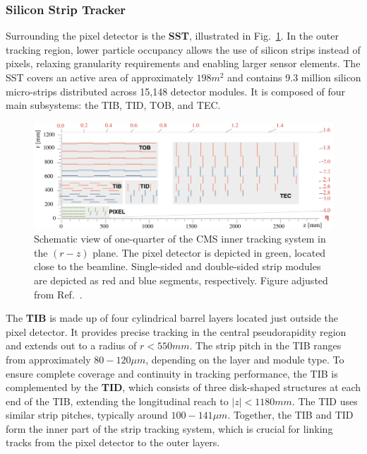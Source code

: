 \subsubsection{Silicon Strip Tracker}
Surrounding the pixel detector is the \textbf{\ac{SST}}, illustrated in Fig.~\ref{Figure:Chapter3_Tracker_Geometry}. In the outer tracking region, lower particle occupancy allows the use of silicon strips instead of pixels, relaxing granularity requirements and enabling larger sensor elements. The SST covers an active area of approximately $198\unit{m}^2$ and contains 9.3 million silicon micro-strips distributed across 15,148 detector modules. It is composed of four main subsystems: the \ac{TIB}, \ac{TID}, \ac{TOB}, and \ac{TEC}.

\begin{figure}[h]
\centering
\includegraphics[width=1\textwidth]{Figures/Chapter3/Phase1_Tracker.pdf}
\caption[Schematic of CMS inner tracking system in the $(r-z)$ plane]{Schematic view of one-quarter of the CMS inner tracking system in the $(r-z)$ plane. The pixel detector is depicted in green, located close to the beamline. Single-sided and double-sided strip modules are depicted as red and blue segments, respectively. Figure adjusted from Ref.~\cite{CMS_Detector_Run3}.}
\label{Figure:Chapter3_Tracker_Geometry}
\end{figure}

The \textbf{TIB} is made up of four cylindrical barrel layers located just outside the pixel detector. It provides precise tracking in the central pseudorapidity region and extends out to a radius of $r < 550\unit{mm}$. The strip pitch in the TIB ranges from approximately $80-120\unit{\mu m}$, depending on the layer and module type. To ensure complete coverage and continuity in tracking performance, the TIB is complemented by the \textbf{TID}, which consists of three disk-shaped structures at each end of the TIB, extending the longitudinal reach to $|z| < 1180\unit{mm}$. The TID uses similar strip pitches, typically around $100-141\unit{\mu m}$. Together, the TIB and TID form the inner part of the strip tracking system, which is crucial for linking tracks from the pixel detector to the outer layers.

